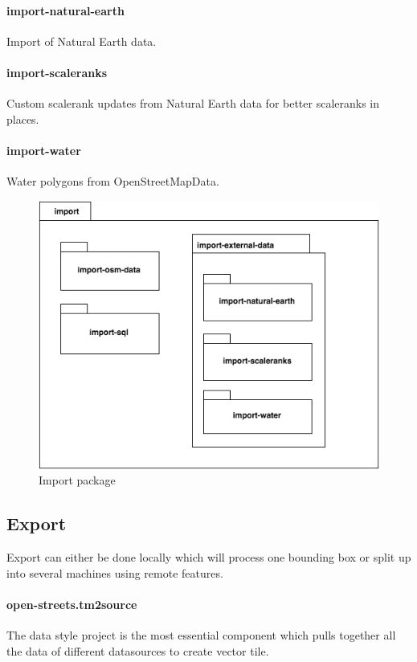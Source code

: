 \paragraph{import-natural-earth}
Import of Natural Earth data.

\paragraph{import-scaleranks}
Custom scalerank updates from Natural Earth data for better scaleranks in places.

\paragraph{import-water}
Water polygons from OpenStreetMapData.

\begin{figure}[h]
  \includegraphics[scale=0.6]{images/import_package.png}
  \caption{Import package}
\end{figure}

\newpage
\subsection{Export}
Export can either be done locally which will process one bounding box or
split up into several machines using remote features.

\paragraph{open-streets.tm2source}
The data style project is the most essential component which pulls together all the
data of different datasources to create vector tile. 

